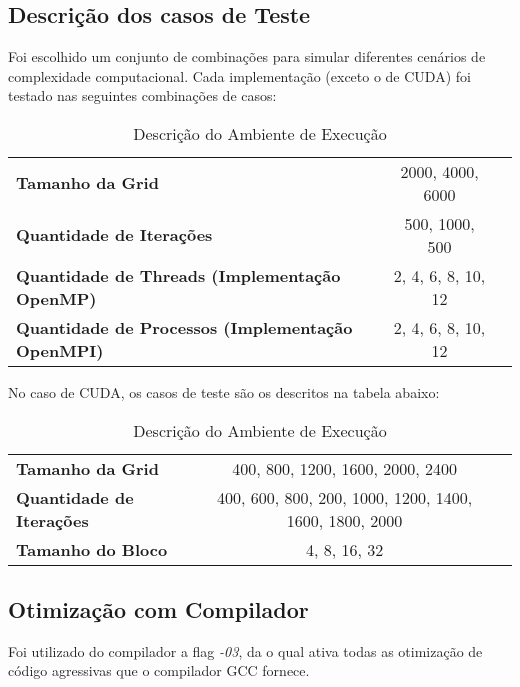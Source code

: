 \subsection{Descrição dos casos de Teste}

Foi escolhido um conjunto de combinações para simular diferentes cenários de complexidade computacional.
Cada implementação (exceto o de CUDA) foi testado nas seguintes combinações de casos:

\begin{table}[H]
    \centering
    \caption{Descrição do Ambiente de Execução}
    \label{tab:exemplo}
    \begin{tabular}{lcc}
        \toprule
        \textbf{Tamanho da Grid}                                 & 2000, 4000, 6000   \\
        \textbf{Quantidade de Iterações}                         & 500, 1000, 500     \\
        \textbf{Quantidade de Threads (Implementação OpenMP)}    & 2, 4, 6, 8, 10, 12 \\
        \textbf{Quantidade de Processos (Implementação OpenMPI)} & 2, 4, 6, 8, 10, 12 \\
        \bottomrule
    \end{tabular}
\end{table}

No caso de CUDA, os casos de teste são os descritos na tabela abaixo:

\begin{table}[H]
    \centering
    \caption{Descrição do Ambiente de Execução}
    \label{tab:exemplo}
    \begin{tabular}{lcc}
        \toprule
        \textbf{Tamanho da Grid}         & 400, 800, 1200, 1600, 2000, 2400                       \\
        \textbf{Quantidade de Iterações} & 400, 600, 800, 200, 1000, 1200, 1400, 1600, 1800, 2000 \\
        \textbf{Tamanho do Bloco}        & 4, 8, 16, 32                                           \\
        \bottomrule
    \end{tabular}
\end{table}

\subsection{Otimização com Compilador}

Foi utilizado do compilador a flag \textit{-03}, da o qual ativa todas as otimização de código agressivas que o compilador GCC fornece.

